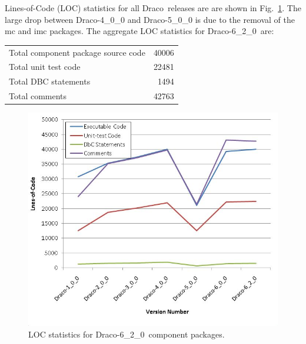 \documentclass[note]{ResearchNote_pdf}
\newcommand{\draco}{Draco}
\newcommand{\dracor}{\draco-6\_2\_0}
\begin{document}


Lines-of-Code (LOC) statistics for all \draco\ releases are are shown
in Fig.~\ref{fig:stats}.  The large drop between \draco-4\_0\_0 and
\draco-5\_0\_0 is due to the removal of the \textsf{mc} and
\textsf{imc} packages. The aggregate LOC statistics for \dracor\ are:
\begin{center}
  \begin{tabular}{|l|r|} \hline
    Total component package source code & 40006 \\
    Total unit test code & 22481 \\
    Total DBC statements & 1494 \\
    Total comments & 42763 \\
    \hline
  \end{tabular}
\end{center}

\begin{figure}
  \label{fig:stats}
  \centerline{
    \includegraphics[width=4.5in]{loc-6_2_0.jpg}}
  \caption{LOC statistics for \dracor\ component packages.}
\end{figure}
\end{document}
